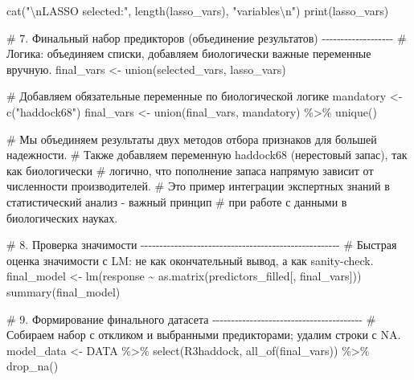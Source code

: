 \documentclass[
  letterpaper,
  DIV=11,
  numbers=noendperiod]{scrreprt}
\newenvironment{Shaded}{\begin{snugshade}}{\end{snugshade}}
\newcommand{\CommentTok}[1]{\textcolor[rgb]{0.37,0.37,0.37}{#1}}
\newcommand{\FunctionTok}[1]{\textcolor[rgb]{0.28,0.35,0.67}{#1}}
\newcommand{\NormalTok}[1]{\textcolor[rgb]{0.00,0.23,0.31}{#1}}
\newcommand{\OtherTok}[1]{\textcolor[rgb]{0.00,0.23,0.31}{#1}}
\newcommand{\SpecialCharTok}[1]{\textcolor[rgb]{0.37,0.37,0.37}{#1}}
\newcommand{\StringTok}[1]{\textcolor[rgb]{0.13,0.47,0.30}{#1}}
\begin{document}
\begin{Shaded}
\begin{Highlighting}[]
\FunctionTok{cat}\NormalTok{(}\StringTok{"}\SpecialCharTok{\textbackslash{}n}\StringTok{LASSO selected:"}\NormalTok{, }\FunctionTok{length}\NormalTok{(lasso\_vars), }\StringTok{"variables}\SpecialCharTok{\textbackslash{}n}\StringTok{"}\NormalTok{)}
\FunctionTok{print}\NormalTok{(lasso\_vars)}

\CommentTok{\# 7. Финальный набор предикторов (объединение результатов) {-}{-}{-}{-}{-}{-}{-}{-}{-}{-}{-}{-}{-}{-}{-}{-}{-}{-}{-}}
\CommentTok{\# Логика: объединяем списки, добавляем биологически важные переменные вручную.}
\NormalTok{final\_vars }\OtherTok{\textless{}{-}} \FunctionTok{union}\NormalTok{(selected\_vars, lasso\_vars) }

\CommentTok{\# Добавляем обязательные переменные по биологической логике}
\NormalTok{mandatory }\OtherTok{\textless{}{-}} \FunctionTok{c}\NormalTok{(}\StringTok{"haddock68"}\NormalTok{)}
\NormalTok{final\_vars }\OtherTok{\textless{}{-}} \FunctionTok{union}\NormalTok{(final\_vars, mandatory) }\SpecialCharTok{\%\textgreater{}\%} \FunctionTok{unique}\NormalTok{()}

\CommentTok{\# Мы объединяем результаты двух методов отбора признаков для большей надежности.}
\CommentTok{\# Также добавляем переменную haddock68 (нерестовый запас), так как биологически }
\CommentTok{\# логично, что пополнение запаса напрямую зависит от численности производителей. }
\CommentTok{\# Это пример интеграции экспертных знаний в статистический анализ {-} важный принцип }
\CommentTok{\# при работе с данными в биологических науках.}

\CommentTok{\# 8. Проверка значимости {-}{-}{-}{-}{-}{-}{-}{-}{-}{-}{-}{-}{-}{-}{-}{-}{-}{-}{-}{-}{-}{-}{-}{-}{-}{-}{-}{-}{-}{-}{-}{-}{-}{-}{-}{-}{-}{-}{-}{-}{-}{-}{-}{-}{-}{-}{-}{-}{-}{-}{-}{-}{-}}
\CommentTok{\# Быстрая оценка значимости с LM: не как окончательный вывод, а как sanity{-}check.}
\NormalTok{final\_model }\OtherTok{\textless{}{-}} \FunctionTok{lm}\NormalTok{(response }\SpecialCharTok{\textasciitilde{}} \FunctionTok{as.matrix}\NormalTok{(predictors\_filled[, final\_vars]))}
\FunctionTok{summary}\NormalTok{(final\_model)}

\CommentTok{\# 9. Формирование финального датасета {-}{-}{-}{-}{-}{-}{-}{-}{-}{-}{-}{-}{-}{-}{-}{-}{-}{-}{-}{-}{-}{-}{-}{-}{-}{-}{-}{-}{-}{-}{-}{-}{-}{-}{-}{-}{-}{-}{-}{-}}
\CommentTok{\# Собираем набор с откликом и выбранными предикторами; удалим строки с NA.}
\NormalTok{model\_data }\OtherTok{\textless{}{-}}\NormalTok{ DATA }\SpecialCharTok{\%\textgreater{}\%}
  \FunctionTok{select}\NormalTok{(R3haddock, }\FunctionTok{all\_of}\NormalTok{(final\_vars)) }\SpecialCharTok{\%\textgreater{}\%}
  \FunctionTok{drop\_na}\NormalTok{()}


\end{Highlighting}
\end{Shaded}
\end{document}
